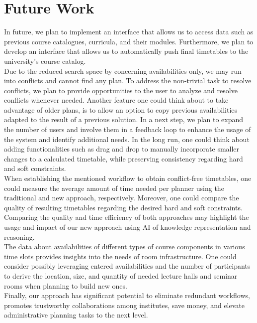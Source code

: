\documentclass{easychair}
\begin{document}
\section{Future Work}
\label{sec:future}
  In future, we plan to implement an interface that allows us to access data such as previous course catalogues, curricula, and their modules.
  Furthermore, we plan to develop an interface that allows us to automatically push final timetables to the university's course catalog. \\
  Due to the reduced search space by concerning availabilities only, we may run into conflicts and cannot find any plan.  
  To address the non-trivial task to resolve conflicts, we plan to provide opportunities to the user to analyze and resolve conflicts whenever needed. 
  Another feature one could think about to take advantage of older plans, is to allow an option to copy previous availabilities adapted to the result of a previous solution. 
  In a next step, we plan to expand the number of users and involve them in a feedback loop to enhance the usage of the system and identify additional needs.
  In the long run, one could think about adding functionalities such as drag and drop to manually incorporate smaller changes to a calculated timetable, while preserving consistency regarding hard and soft constraints. \\
  When establishing the mentioned workflow to obtain conflict-free timetables, one could measure the average amount of time needed per planner using the traditional and new approach, respectively.
  Moreover, one could compare the quality of resulting timetables regarding the desired hard and soft constraints. 
  Comparing the quality and time efficiency of both approaches may highlight the usage and impact of our new approach using AI of knowledge representation and reasoning. \\
  The data about availabilities of different types of course components in various time slots provides insights into the needs of room infrastructure. 
  One could consider possibly leveraging entered availabilities and the number of participants to derive the location, size, and quantity of needed lecture halls and seminar rooms when planning to build new ones. \\
  Finally, our approach has significant potential to eliminate redundant workflows, promotes trustworthy collaborations among institutes, save money, and elevate administrative planning tasks to the next level. 
\end{document}
